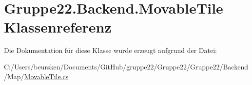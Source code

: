 \hypertarget{class_gruppe22_1_1_backend_1_1_movable_tile}{\section{Gruppe22.\-Backend.\-Movable\-Tile Klassenreferenz}
\label{class_gruppe22_1_1_backend_1_1_movable_tile}
}


Die Dokumentation für diese Klasse wurde erzeugt aufgrund der Datei\-:\begin{DoxyCompactItemize}
\item 
C\-:/\-Users/beursken/\-Documents/\-Git\-Hub/gruppe22/\-Gruppe22/\-Gruppe22/\-Backend/\-Map/\hyperlink{_movable_tile_8cs}{Movable\-Tile.\-cs}\end{DoxyCompactItemize}
